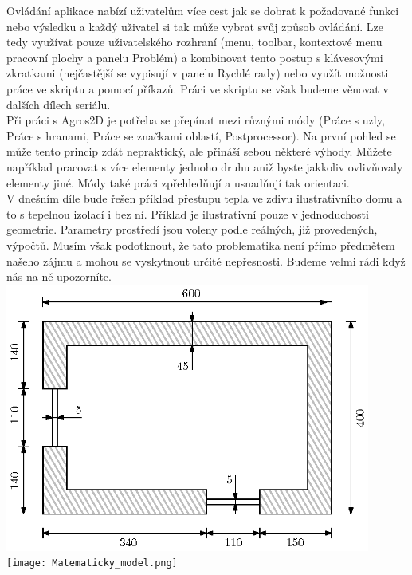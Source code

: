 \documentclass[a4paper, oneside]{article}
\begin{document}
\indent Ovládání aplikace nabízí uživatelům více cest jak se dobrat k požadované funkci nebo výsledku a každý uživatel si tak může vybrat svůj způsob ovládání. Lze tedy využívat pouze uživatelského rozhraní (menu, toolbar, kontextové menu pracovní plochy a panelu Problém) a kombinovat tento postup s klávesovými zkratkami (nejčastější se vypisují v panelu Rychlé rady) nebo využít možnosti práce ve skriptu a pomocí příkazů. Práci ve skriptu se však budeme věnovat v dalších dílech seriálu.\\
\indent Při práci s Agros2D je potřeba se přepínat mezi různými módy (Práce s uzly, Práce s hranami, Práce se značkami oblastí, Postprocessor). Na první pohled se může tento princip zdát nepraktický, ale přináší sebou některé výhody. Můžete například pracovat s více elementy jednoho druhu aniž byste jakkoliv ovlivňovaly elementy jiné. Módy také práci zpřehledňují a usnadňují tak orientaci.\\
\indent V dnešním díle bude řešen příklad přestupu tepla ve zdivu ilustrativního domu a to s tepelnou izolací i bez ní. Příklad je ilustrativní pouze v jednoduchosti geometrie. Parametry prostředí jsou voleny podle reálných, již provedených, výpočtů. Musím však podotknout, že tato problematika není přímo předmětem našeho zájmu a mohou se vyskytnout určité nepřesnosti. Budeme velmi rádi když nás na ně upozorníte.\\
\includegraphics[width=12cm]{Nakres.png}\\
\texttt{[image: Matematicky\_model.png]}\\
\end{document}
